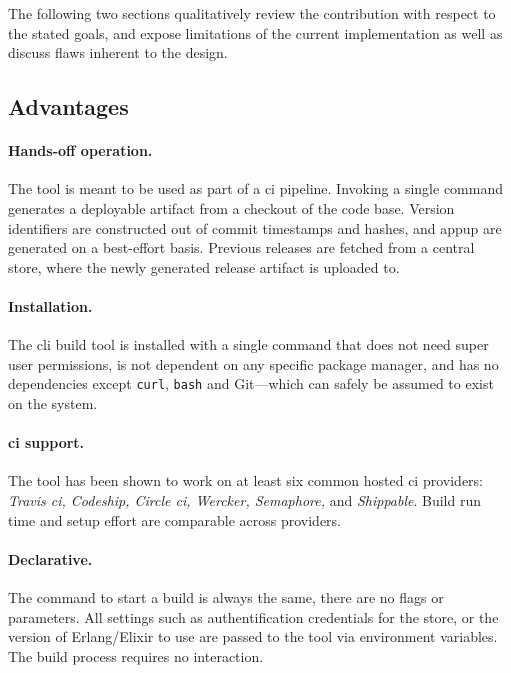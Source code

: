 The following two sections qualitatively review the contribution with respect to the stated goals, and expose limitations of the current implementation as well as discuss flaws inherent to the design.

\subsection{Advantages}

\paragraph{Hands-off operation.} The tool is meant to be used as part of a \acrfull{ci} pipeline. Invoking a single command generates a deployable artifact from a checkout of the code base. Version identifiers are constructed out of commit timestamps and hashes, and \acrfull{appup} are generated on a best-effort basis. Previous releases are fetched from a central store, where the newly generated release artifact is uploaded to.

\paragraph{Installation.} The \acrshort{cli} build tool is installed with a single command that does not need super user permissions, is not dependent on any specific package manager, and has no dependencies except \lstinline|curl|, \lstinline|bash| and Git––which can safely be assumed to exist on the system.

\paragraph{\acrshort{ci} support.} The tool has been shown to work on at least six common hosted \acrfull{ci} providers: \emph{Travis \acrshort{ci}, Codeship, Circle \acrshort{ci}, Wercker, Semaphore,} and \emph{Shippable}. Build run time and setup effort are comparable across providers.

\paragraph{Declarative.} The command to start a build is always the same, there are no flags or parameters. All settings such as authentification credentials for the store, or the version of Erlang/Elixir to use are passed to the tool via environment variables. The build process requires no interaction.

